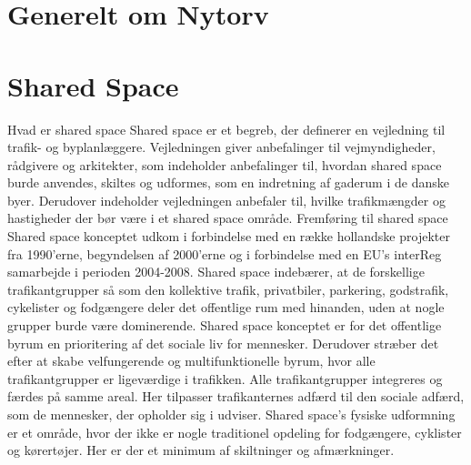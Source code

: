 \section{Generelt om Nytorv}
\label{sec:Generelt om Nytorv}


\section{Shared Space}
\label{sec:Shared Space}
Hvad er shared space
Shared space er et begreb, der definerer en vejledning til trafik- og byplanlæggere. Vejledningen giver anbefalinger til vejmyndigheder, rådgivere og arkitekter, som indeholder anbefalinger til, hvordan shared space burde anvendes, skiltes og udformes, som en indretning af gaderum i de danske byer. Derudover indeholder vejledningen anbefaler til, hvilke trafikmængder og hastigheder der bør være i et shared space område.
Fremføring til shared space
Shared space konceptet udkom i forbindelse med en række hollandske projekter fra 1990’erne, begyndelsen af 2000’erne og i forbindelse med en EU’s interReg samarbejde i perioden 2004-2008.
Shared space indebærer, at de forskellige trafikantgrupper så som den kollektive trafik, privatbiler, parkering, godstrafik, cykelister og fodgængere deler det offentlige rum med hinanden, uden at nogle grupper burde være dominerende. Shared space konceptet er for det offentlige byrum en prioritering af det sociale liv for mennesker. Derudover stræber det efter at skabe velfungerende og multifunktionelle byrum, hvor alle trafikantgrupper er ligeværdige i trafikken. Alle trafikantgrupper integreres og færdes på samme areal. Her tilpasser trafikanternes adfærd til den sociale adfærd, som de mennesker, der opholder sig i udviser. Shared space’s fysiske udformning er et område, hvor der ikke er nogle traditionel opdeling for fodgængere, cyklister og kørertøjer. Her er der et minimum af skiltninger og afmærkninger.

